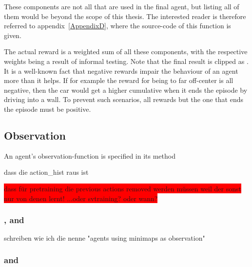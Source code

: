 These components are not all that are used in the final agent, but listing all of them would be beyond the scope of this thesis. The interested reader is therefore referred to appendix~\ref{AppendixD}, where the source-code of this function is given.

The actual reward is a weighted sum of all these components, with the respective weights being a result of informal testing. Note that the final result is clipped as . It is a well-known fact that negative rewards impair the behaviour of an agent more than it helps. If for example the reward for being to far off-center is all negative, then the car would get a higher cumulative when it ends the episode by driving into a wall. To prevent such scenarios, all rewards but the one that ends the episode must be positive.


\subsection{Observation}

\label{sec:observation}

An agent's observation-function is specified in its method 

dass die action_hist raus ist

\colorbox{red}{dass für pretraining die previous actions removed werden müssen weil der sonst nur von denen lernt! ...oder svtraining? oder wann?}

\subsubsection{,  and }


schreiben wie ich die nenne "agents using minimaps as observation"

\subsubsection{ and }

